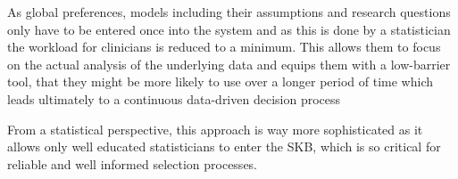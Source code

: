 As global preferences, models including their assumptions and research questions only have to be entered once into the system and as this is done by a statistician the workload for clinicians is reduced to a minimum. This allows them to focus on the actual analysis of the underlying data and equips them with a low-barrier tool, that they might be more likely to use over a longer period of time which leads ultimately to a continuous data-driven decision process

From a statistical perspective, this approach is way more sophisticated as it allows only well educated statisticians to enter the \gls{SKB}, which is so critical for reliable and well informed selection processes. 




